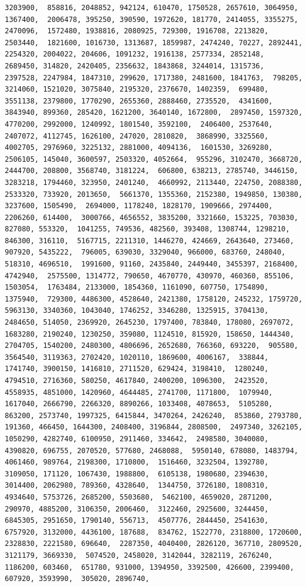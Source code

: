 \documentclass[
]{article}
\begin{document}
\begin{verbatim}
3203900,  858816, 2048852, 942124, 610470, 1750528, 2657610, 3064950, 1367400,  2006478, 395250, 390590, 1972620, 181770, 2414055, 3355275, 2470096,  1572480, 1938816, 2080925, 729300, 1916708, 2213820, 2503440,  1821600, 1016730, 1313687, 1859987, 2474240, 70227, 2892441,  2254320, 2004022, 204606, 1091232, 1916138, 2577334, 2852148,  2689450, 314820, 2420405, 2356632, 1843868, 3244014, 1315736,  2397528, 2247984, 1847310, 299620, 1717380, 2481600, 1841763,  798205, 3214060, 1521020, 3075840, 2195320, 2376670, 1402359,  699480, 3551138, 2379800, 1770290, 2655360, 2888460, 2735520,  4341600, 3843940, 899360, 285420, 1621200, 3640140, 1672800,  2897450, 1597320, 4770200, 2992000, 1240992, 1801540, 3592100,  2406400, 2537640, 2407072, 4112745, 1626100, 247020, 2810820,  3868990, 3325560, 4002705, 2976960, 3225132, 2881000, 4094136,  1601530, 3269280, 2506105, 145040, 3600597, 2503320, 4052664,  955296, 3102470, 3668720, 2444700, 208800, 3568740, 3181224,  606800, 638213, 2785740, 3446150, 3283218, 1794460, 323950, 2401240,  4660992, 2113440, 224750, 2088380, 2533320, 733920, 2013650,  5661370, 1355360, 2152380, 1949850, 130380, 3237600, 1505490,  2694000, 1178240, 1828170, 1909666, 2974400, 2206260, 614400,  3000766, 4656552, 3835200, 3321660, 153225, 703030, 827080, 553320,  1041255, 749536, 482560, 393408, 1308744, 1298210, 846300, 316110,  5167715, 2211310, 1446270, 424669, 2643640, 273460, 907920, 5435222,  796005, 639030, 3329040, 966000, 683760, 248040, 518310, 4696510,  1991600, 91160, 2435840, 2449440, 3455397, 2168400, 4742940,  2575500, 1314772, 790650, 4670770, 430970, 460360, 855106, 1503054,  1763484, 2133000, 1854360, 1161090, 607750, 1754890, 1375940,  729300, 4486300, 4528640, 2421380, 1758120, 245232, 1759720,  5963130, 3340360, 1043040, 1746252, 3346280, 1325915, 3704130,  2484650, 514050, 2369920, 2645230, 1797400, 783840, 178080, 2697072,  1683280, 2190240, 1230250, 359080, 1124510, 815920, 158650, 1444340,  2704705, 1540200, 2480300, 4806696, 2652680, 766360, 693220,  905580, 3564540, 3119363, 2702420, 1020110, 1869600, 4006167,  338844, 1741740, 3900150, 1416810, 2711520, 629424, 3198410,  1280240, 4794510, 2716360, 580250, 4617840, 2400200, 1096300,  2423520, 4558935, 4851000, 1420960, 4644485, 2741700, 1171800,  1079940, 1617040, 2666790, 2266320, 8890266, 1033408, 4078653,  5105280, 863200, 2573740, 1997325, 6415844, 3470264, 2426240,  853860, 2793780, 191360, 466450, 1644300, 2408400, 3196844, 2808500,  2497340, 3262105, 1050290, 4282740, 6100950, 2911460, 334642,  2498580, 3040080, 4390820, 696755, 2070520, 577680, 2468088,  5950140, 678080, 1483794, 4061460, 989764, 2198300, 1710800,  1516460, 3232504, 1392780, 3109050, 171120, 1067430, 1988800,  6105138, 1980680, 2394630, 3014400, 2062980, 789360, 4328640,  1344750, 3726180, 1808310, 4934640, 5753726, 2685200, 5503680,  5462100, 4659020, 2871200, 290970, 4885200, 3106350, 2006460,  3122460, 2925600, 3244450, 6845305, 2951650, 1790140, 556713,  4507776, 2844450, 2541630, 6757920, 3132000, 4436100, 187688,  834762, 1522770, 2318800, 1720600, 2328830, 2221580, 696640,  2287350, 4040400, 2826120, 367710, 2809520, 3121179, 3669330,  5074520, 2458020, 3142044, 3282119, 2676240, 1186200, 603460,  651780, 931000, 1394950, 3392500, 426600, 2399400, 607920, 3593990,  305020, 2896740, 
\end{verbatim}
\end{document}
